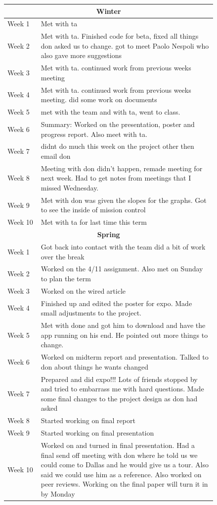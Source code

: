 \documentclass[onecolumn, draftclsnofoot,10pt, compsoc]{IEEEtran}
\begin{document}
\begin{center}
\begin{longtable}{| l | p{0.84\linewidth}|}
    \multicolumn{2}{c}{\textbf{Winter}} \\ \hline
    Week 1 &   Met with ta  \\ \hline
	Week 2 &  Met with ta. Finished code for beta, fixed all things don asked us to change. got to meet Paolo Nespoli who also gave more suggestions \\ \hline
	Week 3 & Met with ta. continued work from previous weeks meeting   \\ \hline
	Week 4 & Met with ta. continued work from previous weeks meeting. did some work on documents \\ \hline
    Week 5 &  met with the team and with ta, went to class.\\ \hline
    Week 6 & Summary: Worked on the presentation, poster and progress report. Also meet with ta.   \\ \hline
	Week 7 & didnt do much this week on the project other then email don \\ \hline
	Week 8 &  Meeting with don didn’t happen, remade meeting for next week. Had to get notes from meetings that I missed Wednesday.  \\ \hline
	Week 9 & Met with don was given the slopes for the graphs. Got to see the inside of mission control  \\ \hline
    Week 10 & Met with ta for last time this term  \\ \hline
    \multicolumn{2}{c}{\textbf{Spring}} \\ \hline
    Week 1 & Got back into contact with the team did a bit of work over the break  \\ \hline
	Week 2 & Worked on the 4/11 assignment. Also met on Sunday to plan the term   \\ \hline
	Week 3 & Worked on the wired article  \\ \hline
	Week 4 &  Finished up and edited the poster for expo. Made small adjustments to the project. \\ \hline
    Week 5 &  Met with done and got him to download and have the app running on his end. He pointed out more things to change.  \\ \hline
    Week 6 & Worked on midterm report and presentation. Talked to don about things he wants changed

  \\ \hline
	Week 7 &Prepared and did expo!!! Lots of friends stopped by and tried  to embarrass me with hard questions. Made some final changes to the project design as don had asked   \\ \hline
	Week 8 & Started working on final report \\ \hline
	Week 9 & Started working on final presentation \\ \hline
    Week 10 & Worked on and turned in final presentation. Had a final send off meeting with don where he told us we could come to Dallas and he would give us a tour. Also said we could use him as a reference. Also worked on peer reviews. Working on the final paper will turn it in by Monday \\ \hline
\end{longtable}
\end{center}
\end{document}
